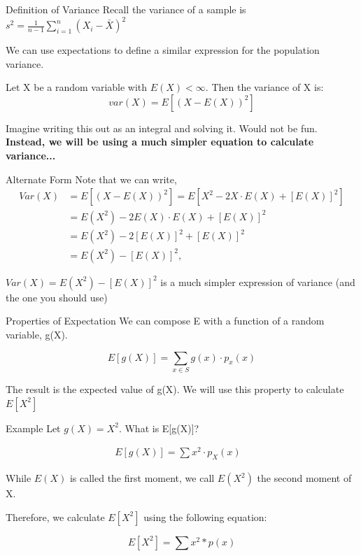 \documentclass{beamer}
\begin{document}
\begin{frame}{Definition of Variance}
	Recall the variance of a sample is $s^2 = \frac{1}{n-1} \sum_{i=1}^n (X_i - \bar{X})^2$

	We can use expectations to define a similar expression for the population variance. 
	
	Let X be a random variable with $E(X)< \infty$. Then the \alert{variance} of X is:
	\[ 
		var(X) = E[(X-E(X))^2] 
	\]

	Imagine writing this out as an integral and solving it. Would not be fun. \textbf{Instead, we will be using a much simpler equation to calculate variance...}
\end{frame}

\begin{frame}{Alternate Form}
	Note that we can write,
	\begin{align*}
		Var(X) & = E[ \left(X - E(X) \right)^2 ] = E[ X^2 - 2X\cdot E(X) + [E(X)]^2 ] \\
		       & = E(X^2) - 2E(X)\cdot E(X) + [E(X)]^2                                \\
		       & = E(X^2) - 2[E(X)]^2 + [E(X)]^2                                      \\
		       & = E(X^2) - [E(X)]^2,                                                 
	\end{align*}
	
	$Var(X)=E(X^2)-[E(X)]^2$ is a much simpler expression of variance (and the one you should use)
\end{frame}

\begin{frame}{Properties of Expectation}
	We can compose E with a function of a random variable, g(X).
	
	\[ 
		E[g(X)]= \sum_{x\in S} g(x) \cdot p_x(x)
	\] 

	The result is the expected value of g(X). We will use this property to calculate $E[X^2]$
\end{frame}

\begin{frame}{Example}
	Let $g(X) = X^2$. What is E[g(X)]?

	\begin{align*}
		E[g(X)] = \sum x^2\cdot p_X(x) &   
	\end{align*}
		
	While $E(X)$ is called the \alert{first moment}, we call $E(X^2)$ the \alert{second moment} of X. 
		
	Therefore, we calculate $E[X^2]$ using the following equation: 
		
	\[ E[X^2] = \sum x^2*p(x) \]
\end{frame}
\end{document}
